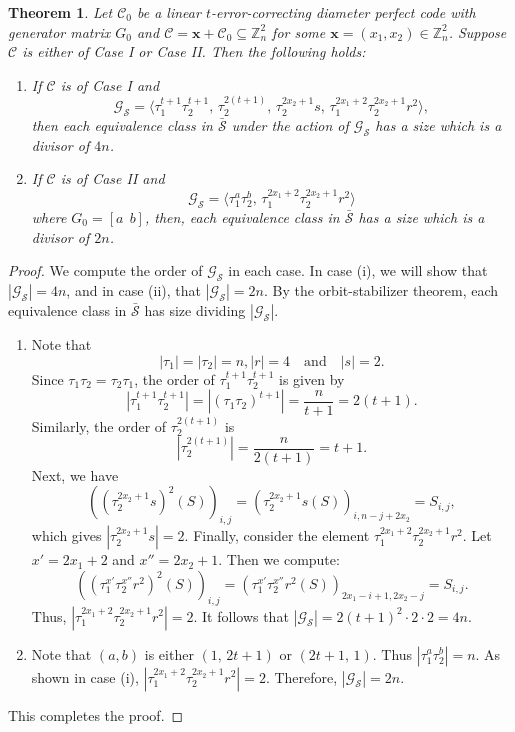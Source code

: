 \documentclass{article}
\newtheorem{theorem}{Theorem}[section]
\theoremstyle{definition}
\begin{document}
\begin{theorem}
Let $\mathcal{C}_0$ be a linear $t$-error-correcting diameter perfect code with generator matrix $G_0$ and $\mathcal{C}=\mathbf{x}+\mathcal{C}_0\subseteq\mathbb{Z}_n^2$ for some $\mathbf{x}=(x_1, x_2)\in\mathbb{Z}_n^2$. Suppose $\mathcal{C}$ is either of Case I or Case II. Then the following holds:
\begin{enumerate}
\item[(i)] If $\mathcal{C}$ is of Case I and
	\[
	\mathcal{G}_\mathcal{S}=\langle \tau_1^{t+1}\tau_2^{t+1},\, \tau_2^{2(t+1)},\, \tau_2^{2x_2+1}s,\, \tau_1^{2x_1+2}\tau_2^{2x_2+1}r^2\rangle,
	\]
	then each equivalence class in $\bar{\mathcal{S}}$ under the action of $\mathcal{G}_\mathcal{S}$ has a size which is a divisor of $4n$.
\item[(ii)] If $\mathcal{C}$ is of Case II and
	\[
	\mathcal{G}_\mathcal{S}=\langle \tau_1^{a}\tau_2^{b},\, \tau_1^{2x_1+2}\tau_2^{2x_2+1}r^2\rangle
	\]
	where $G_0=[a~~b]$, then, each equivalence class in $\bar{\mathcal{S}}$ has a size which is a divisor of $2n$.
\end{enumerate}
\end{theorem}
\begin{proof}
We compute the order of $\mathcal{G}_\mathcal{S}$ in each case. In case (i), we will show that $|\mathcal{G}_\mathcal{S}| = 4n$, and in case (ii), that $|\mathcal{G}_\mathcal{S}| = 2n$. By the orbit-stabilizer theorem, each equivalence class in $\bar{\mathcal{S}}$ has size dividing $|\mathcal{G}_\mathcal{S}|$.
\begin{enumerate}
\item[(i)] Note that
\[
|\tau_1|=|\tau_2|=n, |r|=4\quad\mbox{and}\quad |s|=2.
\]
Since $\tau_1\tau_2=\tau_2\tau_1$, the order of $\tau_1^{t+1}\tau_2^{t+1}$ is given by
\[
|\tau_1^{t+1}\tau_2^{t+1}|=|(\tau_1\tau_2)^{t+1}|=\frac{n}{t+1}=2(t+1).
\]
Similarly, the order of $\tau_2^{2(t+1)}$ is
\[
|\tau_2^{2(t+1)}|=\frac{n}{2(t+1)}=t+1.
\]
Next, we have
\[
((\tau_2^{2x_2+1}s)^2(S))_{i, j}=(\tau_2^{2x_2+1}s(S))_{i, n-j+2x_2}=S_{i, j},
\]
which gives $|\tau_2^{2x_2+1}s|=2$. Finally, consider the element $\tau_1^{2x_1 + 2} \tau_2^{2x_2 + 1} r^2$. Let $x'=2x_1 + 2$ and $x''=2x_2 + 1$. Then we compute:
	\[
	((\tau_1^{x'}\tau_2^{x''}r^2)^2(S))_{i, j}=(\tau_1^{x'}\tau_2^{x''}r^2(S))_{2x_1-i+1, 2x_2-j}=S_{i ,j}.
	\]
	Thus, $|\tau_1^{2x_1 + 2} \tau_2^{2x_2 + 1} r^2|=2$. It follows that	$|\mathcal{G}_\mathcal{S}|=2(t+1)^2\cdot 2\cdot 2=4n.$
\item[(ii)] Note that $(a, b)$ is either $(1,\, 2t+1)$ or $(2t+1,\, 1)$. Thus $|\tau_1^{a} \tau_2^{b}| = n$. As shown in case (i), $|\tau_1^{2x_1 + 2} \tau_2^{2x_2 + 1} r^2| = 2$. Therefore, $|\mathcal{G}_\mathcal{S}| = 2n$.
\end{enumerate}
This completes the proof. \end{proof}
\end{document}
